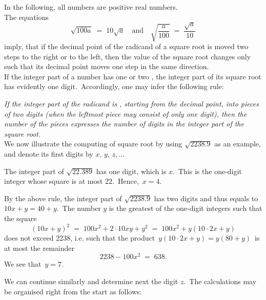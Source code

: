 \documentclass[12pt]{article}
\theoremstyle{definition}
\begin{document}
   

In the following, all numbers are positive real numbers.\\

The equations
$$\sqrt{100a} \;=\; 10\sqrt{a} \quad \mbox{and} \quad \sqrt{\frac{a}{100}} \;=\; \frac{\sqrt{a}}{10}$$
imply, that if the decimal point of the radicand of a square root is moved two steps to the right or to the left, then the value of the square root changes only such that its decimal point moves one step in the same direction.\\

If the integer part of a number has one or two , the integer part of its square root has evidently one digit.\, Accordingly, one may infer the following rule:

\emph{If the integer part of the radicand is , starting from the decimal point, into pieces of two digits (when the leftmost piece may consist of only one digit), then the number of the pieces expresses the number of digits in the integer part of the square root.}\\

We now illustrate the computing of square root by using $\sqrt{2238.9}$ as an example, and denote its first digits by $x,\,y,\,z,\ldots$

The integer part of $\sqrt{22.389}$ has one digit, which is $x$.\, This is the  one-digit integer whose square is at most 22.\, Hence,\, $x = 4$.

By the above rule, the integer part of $\sqrt{2238.9}$ has two digits and thus equals to\, $10x\!+\!y = 40\!+\!y$.\, The number $y$ is the greatest of the one-digit integers such that the square
$$(10x\!+\!y)^2 \;=\; 100x^2\!+\!2\!\cdot\!10xy\!+\!y^2 \;=\; 100x^2\!+\!y(10\!\cdot\!2x\!+\!y)$$
does not exceed 2238, i.e. such that the product \,$y(10\!\cdot\!2x\!+\!y) = y(80\!+\!y)$\, is at most the remainder
$$2238\!-\!100x^2 \;=\; 638.$$
We see that\, $y = 7$.

We can continue similarly and determine next the digit $z$.\, The calculations may be organised right from the start as follows:\\
\end{document}
